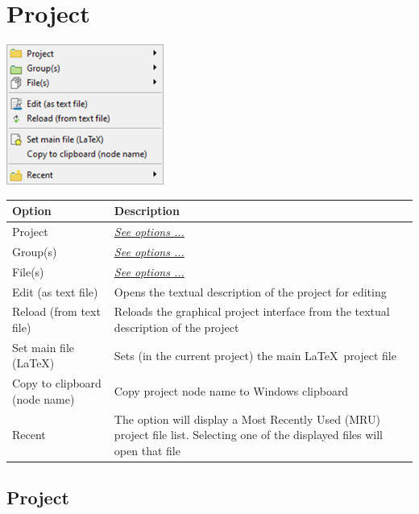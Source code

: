 
\hypertarget{menu_project}{}
\section{Project}

\includegraphics[scale=0.8]{./res/menu_project.png}\\

\begin{scriptsize}\begin{tabularx}{\textwidth}{>{\hsize=0.3\hsize}X>{\hsize=0.8\hsize}X}\\
    \hline
    \textbf{Option} & \textbf{Description} \\
    \hline
    Project & \textit{\href{\#menu\_project\_project}{See options ...}} \\
    Group(s) & \textit{\href{\#menu\_project\_group}{See options ...}} \\
    File(s) & \textit{\href{\#menu\_project\_file}{See options ...}} \\
    \hdashline[1pt/1pt]
    Edit (as text file) & Opens the textual description of the project for editing \\
    Reload (from text file) & Reloads the graphical project interface from the
     textual description of the project \\
    \hdashline[1pt/1pt]
    Set main file (\LaTeX) & Sets (in the current project) the main \LaTeX ~project file \\
    Copy to clipboard (node name) & Copy project node name to Windows clipboard \\
    \hdashline[1pt/1pt]
    Recent & The option will display a Most Recently Used (MRU) project file list.
     Selecting one of the displayed files will open that file \\
    \hline
  \end{tabularx}\end{scriptsize}


\hypertarget{menu_project_project}{}
\subsection{Project}


